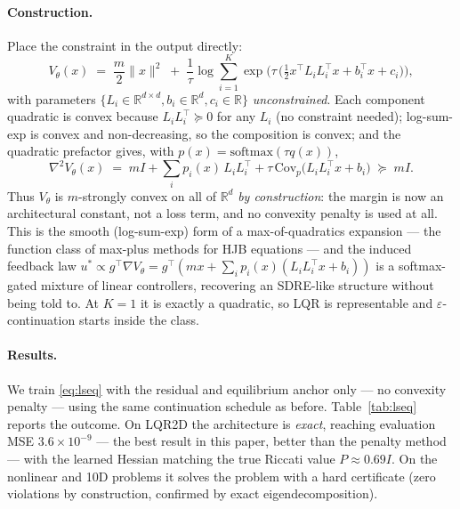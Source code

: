 \documentclass[11pt,a4paper]{article}
\newcommand{\R}{\mathbb{R}}
\begin{document}
\paragraph{Construction.} Place the constraint in the output directly:
\begin{equation}\label{eq:lseq}
  V_\theta(x) \;=\; \frac{m}{2}\|x\|^2
  \;+\; \frac{1}{\tau}\log \sum_{i=1}^{K}
  \exp\!\Big( \tau\,\big( \tfrac12 x^\top L_i L_i^\top x + b_i^\top x + c_i \big) \Big),
\end{equation}
with parameters $\{L_i \in \R^{d\times d}, b_i \in \R^d, c_i \in \R\}$
\emph{unconstrained}. Each component quadratic is convex because
$L_i L_i^\top \succeq 0$ for any $L_i$ (no constraint needed); log-sum-exp is
convex and non-decreasing, so the composition is convex; and the quadratic
prefactor gives, with $p(x) = \mathrm{softmax}(\tau q(x))$,
\begin{equation}
  \nabla^2 V_\theta(x) \;=\; mI + \sum_i p_i(x)\, L_i L_i^\top
  + \tau\,\mathrm{Cov}_{p}\!\big(L_i L_i^\top x + b_i\big)
  \;\succeq\; mI .
\end{equation}
Thus $V_\theta$ is $m$-strongly convex on all of $\R^d$ \emph{by
construction}: the margin is now an architectural constant, not a loss term,
and no convexity penalty is used at all. This is the smooth (log-sum-exp)
form of a max-of-quadratics expansion --- the function class of max-plus
methods for HJB equations \cite{mceneaney2007curse} --- and the induced
feedback law $u^* \propto g^\top \nabla V_\theta = g^\top(mx + \sum_i p_i(x)
(L_i L_i^\top x + b_i))$ is a softmax-gated mixture of linear controllers,
recovering an SDRE-like structure without being told to. At $K=1$ it is
exactly a quadratic, so LQR is representable and $\varepsilon$-continuation
starts inside the class.

\paragraph{Results.} We train \eqref{eq:lseq} with the residual and
equilibrium anchor only --- no convexity penalty --- using the same
continuation schedule as before. Table~\ref{tab:lseq} reports the outcome.
On LQR2D the architecture is \emph{exact}, reaching evaluation MSE
$3.6\times10^{-9}$ --- the best result in this paper, better than the penalty
method --- with the learned Hessian matching the true Riccati value
$P\approx0.69I$. On the nonlinear and 10D problems it solves the problem with
a hard certificate (zero violations by construction, confirmed by exact
eigendecomposition).
\end{document}
